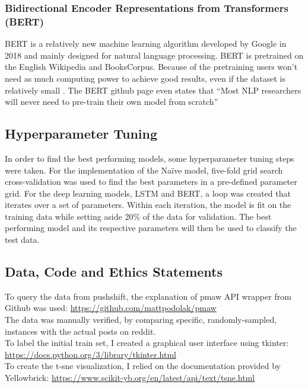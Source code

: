 \documentclass[11pt, a4paper]{article}
\begin{document}
\subsubsection{Bidirectional Encoder Representations from Transformers (BERT)} \label{subs:bert}
BERT is a relatively new machine learning algorithm developed by Google in 2018 and mainly designed for 
natural language processing. BERT is pretrained on the English Wikipedia and BooksCorpus. Because of the 
pretraining users won’t need as much computing power to achieve good results, even if the dataset is relatively 
small \citep{devlin2019bertpo}. The BERT github page even states that 
“Most NLP researchers will never need to pre-train their own model from scratch” \citep{googlegithub}

\subsection{Hyperparameter Tuning} \label{subs:hyperparams}
In order to find the best performing models, some hyperparameter tuning steps were taken. For the implementation of the Naïve model, five-fold grid search cross-validation was used to find the best parameters in a pre-defined parameter grid.
For the deep learning models, LSTM and BERT, a loop was created that iterates over a set of parameters. Within each iteration, the model is fit on the training data while setting aside 20\% of the data for validation. The best performing model
and its respective parameters will then be used to classify the test data.

\subsection{Data, Code and Ethics Statements} \label{datacodeethics}
To query the data from pushshift, the explanation of pmaw API wrapper from Github was used: \url{https://github.com/mattpodolak/pmaw}\\
The data was manually verified, by comparing specific, randomly-sampled, instances with the actual posts on reddit.\\

\noindent To label the initial train set, I created a graphical user interface using tkinter: \url{https://docs.python.org/3/library/tkinter.html}\\

\noindent To create the t-sne visualization, I relied on the documentation provided by Yellowbrick: \url{https://www.scikit-yb.org/en/latest/api/text/tsne.html}\\
\end{document}
